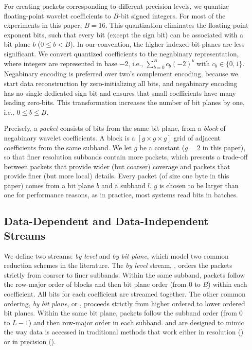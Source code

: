 For creating packets corresponding to different precision levels, we quantize floating-point wavelet
coefficients to $B$-bit signed integers. For most of the experiments in this paper, $B=16$. This
quantization eliminates the floating-point exponent bits, such that every bit (except the sign bit)
can be associated with a bit plane $b$ ($0\leq b < B$). In our convention, the higher indexed bit
planes are less significant. We convert quantized coefficients to the negabinary representation,
where integers are represented in base $-2$, i.e., $\sum_{b=0}^{B}{c_b(-2)^b}$ with $c_b\in
\{0,1\}$. Negabinary encoding is preferred over two's complement encoding, because we start data
reconstruction by zero-initializing all bits, and negabinary encoding has no single dedicated sign
bit and ensures that small coefficients have many leading zero-bits.
%
This transformation increases the number of bit planes by one, i.e., $0\leq b \leq B$.

Precisely, a \emph{packet} consists of bits from the same bit plane, from a \emph{block} of
negabinary wavelet coefficients. A block is a $[g\times g\times g]$ grid of adjacent coefficients
from the same subband. We let $g$ be a constant ($g=2$ in this paper), so that finer resolution
subbands contain more packets, which presents a trade-off between packets that provide wider (but
coarser) coverage and packets that provide finer (but more local) details. Every packet (of size one
byte in this paper) comes from a bit plane $b$ and a subband $l$. $g$ is chosen to be larger than
one for performance reasons, as in practice, most systems read bits in batches.

\subsection{Data-Dependent and Data-Independent Streams} \label{sec:static-dynamic-streams}

We define two streams: \emph{by level} and \emph{by bit plane}, which model two common reduction
schemes in the literature. The \emph{by level} stream, \slvl, orders the packets strictly from
coarser to finer subbands. Within the same subband, packets follow the row-major order of blocks and
then bit plane order (from 0 to $B$) within each coefficient. All bits for each coefficient are
streamed together. The other common ordering, \emph{by bit plane}, or \sbit, proceeds strictly from
higher ordered to lower ordered bit planes. Within the same bit plane, packets follow the subband
order (from $0$ to $L-1$) and then row-major order in each subband. \slvl and \sbit are designed to
mimic the way data is accessed in traditional methods that work either in resolution (\slvl) or in
precision (\sbit).

